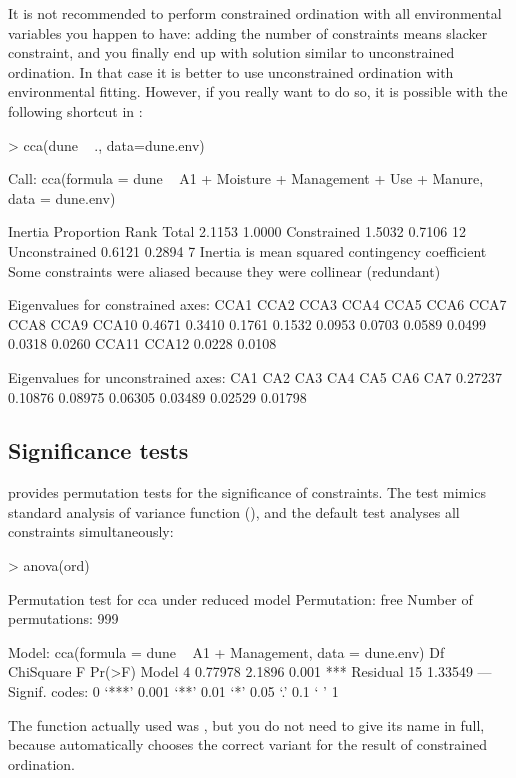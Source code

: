 \documentclass[a4paper,10pt]{article}
\begin{document}
It is not recommended to perform constrained ordination with all
environmental variables you happen to have: adding the number of
constraints means slacker constraint, and you finally end up with
solution similar to unconstrained ordination. In that case it is
better to use unconstrained ordination with environmental fitting.
However, if you really want to do so, it is possible with the
following shortcut in :
\begin{Schunk}
\begin{Sinput}
> cca(dune ~ ., data=dune.env)
\end{Sinput}
\begin{Soutput}
Call: cca(formula = dune ~ A1 + Moisture + Management + Use +
Manure, data = dune.env)

              Inertia Proportion Rank
Total          2.1153     1.0000     
Constrained    1.5032     0.7106   12
Unconstrained  0.6121     0.2894    7
Inertia is mean squared contingency coefficient 
Some constraints were aliased because they were collinear (redundant)

Eigenvalues for constrained axes:
  CCA1   CCA2   CCA3   CCA4   CCA5   CCA6   CCA7   CCA8   CCA9  CCA10 
0.4671 0.3410 0.1761 0.1532 0.0953 0.0703 0.0589 0.0499 0.0318 0.0260 
 CCA11  CCA12 
0.0228 0.0108 

Eigenvalues for unconstrained axes:
    CA1     CA2     CA3     CA4     CA5     CA6     CA7 
0.27237 0.10876 0.08975 0.06305 0.03489 0.02529 0.01798 
\end{Soutput}
\end{Schunk}

\subsection{Significance tests}

 provides permutation tests for the significance of
constraints.  The test mimics standard analysis of variance function
(), and the default test analyses all constraints
simultaneously:
\begin{Schunk}
\begin{Sinput}
> anova(ord)
\end{Sinput}
\begin{Soutput}
Permutation test for cca under reduced model
Permutation: free
Number of permutations: 999

Model: cca(formula = dune ~ A1 + Management, data = dune.env)
         Df ChiSquare      F Pr(>F)    
Model     4   0.77978 2.1896  0.001 ***
Residual 15   1.33549                  
---
Signif. codes:  0 ‘***’ 0.001 ‘**’ 0.01 ‘*’ 0.05 ‘.’ 0.1 ‘ ’ 1
\end{Soutput}
\end{Schunk}
The function actually used was , but you do not need
to give its name in full, because  automatically chooses the
correct  variant for the result of constrained
ordination.
\end{document}
